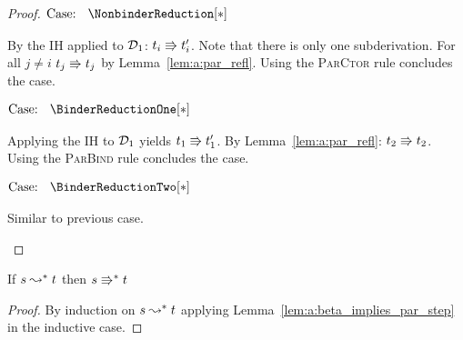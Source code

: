 \begin{proof}
    $\text{Case: }\begin{array}{c} \NonbinderReduction[*] \end{array}$
    \begin{proofcase}
        By the IH applied to $\mathcal{D}_{1}$: $t_i \Rrightarrow t_i^\prime$.
        Note that there is only one subderivation.
        For all $j \neq i$ $t_j \Rrightarrow t_j$ by Lemma~\ref{lem:a:par_refl}.
        Using the \textsc{ParCtor} rule concludes the case.
    \end{proofcase}

    $\text{Case: }\begin{array}{c} \BinderReductionOne[*] \end{array}$
    \begin{proofcase}
        Applying the IH to $\mathcal{D}_{1}$ yields $t_1 \Rrightarrow t_1^\prime$.
        By Lemma~\ref{lem:a:par_refl}: $t_2 \Rrightarrow t_2$.
        Using the \textsc{ParBind} rule concludes the case.
    \end{proofcase}

    $\text{Case: }\begin{array}{c} \BinderReductionTwo[*] \end{array}$
    \begin{proofcase}
        Similar to previous case.
    \end{proofcase}
\end{proof}

\begin{lemma}
    If $s \leadsto^* t$ then $s \Rrightarrow^* t$
    \label{lem:a:beta_implies_par}
\end{lemma}
\begin{proof}
    By induction on $s \leadsto^* t$ applying Lemma~\ref{lem:a:beta_implies_par_step} in the inductive case.
\end{proof}

